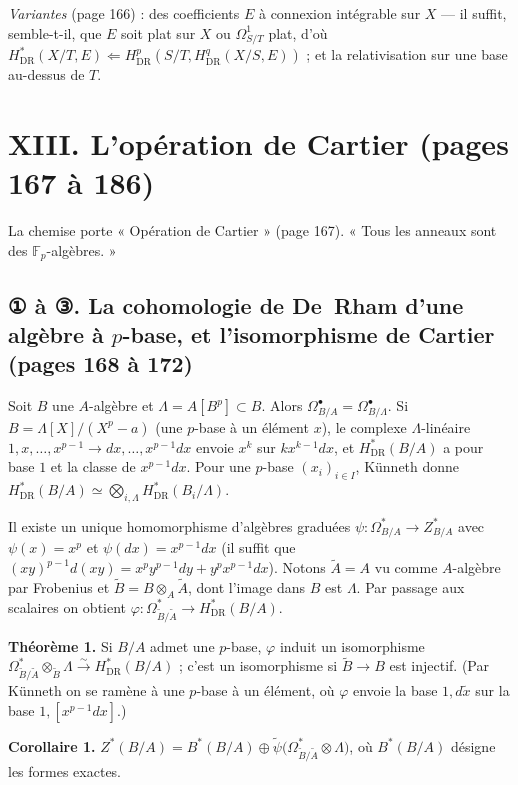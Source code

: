 \documentclass[11pt,a4paper]{article}
\begin{document}
\emph{Variantes} (page 166) : des coefficients $E$ à connexion intégrable sur
$X$ — il suffit, semble-t-il, que $E$ soit plat sur $X$ ou $\Omega^1_{S/T}$
plat, d'où $H^*_{\mathrm{DR}}(X/T, E) \Leftarrow H^p_{\mathrm{DR}}(S/T,
H^q_{\mathrm{DR}}(X/S, E))$ ; et la relativisation sur une base au-dessus de $T$.

\section*{XIII. L'opération de Cartier (pages 167 à 186)}

La chemise porte « Opération de Cartier » (page 167). « Tous les anneaux sont
des $\mathbb{F}_p$-algèbres. »

\subsection*{① à ③. La cohomologie de De~Rham d'une algèbre à $p$-base, et l'isomorphisme de Cartier (pages 168 à 172)}

Soit $B$ une $A$-algèbre et $\Lambda = A[B^p] \subset B$. Alors
$\Omega^\bullet_{B/A} = \Omega^\bullet_{B/\Lambda}$. Si $B = \Lambda[X]/(X^p - a)$
(une $p$-base à un élément $x$), le complexe $\Lambda$-linéaire $1, x, \ldots,
x^{p-1} \to dx, \ldots, x^{p-1}dx$ envoie $x^k$ sur $kx^{k-1}dx$, et
$H^*_{\mathrm{DR}}(B/A)$ a pour base $1$ et la classe de $x^{p-1}dx$. Pour une
$p$-base $(x_i)_{i \in I}$, Künneth donne $H^*_{\mathrm{DR}}(B/A) \simeq
\bigotimes_{i,\Lambda} H^*_{\mathrm{DR}}(B_i/\Lambda)$.

Il existe un unique homomorphisme d'algèbres graduées $\psi : \Omega^*_{B/A}
\to Z^*_{B/A}$ avec $\psi(x) = x^p$ et $\psi(dx) = x^{p-1}dx$ (il suffit que
$(xy)^{p-1}d(xy) = x^p y^{p-1}dy + y^p x^{p-1}dx$). Notons $\widetilde{A} = A$
vu comme $A$-algèbre par Frobenius et $\widetilde{B} = B \otimes_A \widetilde A$,
dont l'image dans $B$ est $\Lambda$. Par passage aux scalaires on obtient
$\varphi : \Omega^*_{\widetilde B/\widetilde A} \to H^*_{\mathrm{DR}}(B/A)$.

\textbf{Théorème 1.} Si $B/A$ admet une $p$-base, $\varphi$ induit un
isomorphisme $\Omega^*_{\widetilde B/\widetilde A} \otimes_{\widetilde B} \Lambda
\xrightarrow{\sim} H^*_{\mathrm{DR}}(B/A)$ ; c'est un isomorphisme si $\widetilde B
\to B$ est injectif. (Par Künneth on se ramène à une $p$-base à un élément,
où $\varphi$ envoie la base $1, d\tilde x$ sur la base $1, [x^{p-1}dx]$.)

\textbf{Corollaire 1.} $Z^*(B/A) = B^*(B/A) \oplus \widetilde\psi\bigl(\Omega^*_{\widetilde
B/\widetilde A} \otimes \Lambda\bigr)$, où $B^*(B/A)$ désigne les formes exactes.
\end{document}
